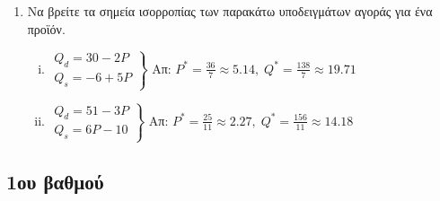 \begin{enumerate}
  \item Να βρείτε τα σημεία ισορροπίας των παρακάτω υποδειγμάτων αγοράς για ένα προϊόν.
    \begin{enumerate}[i),itemsep=\baselineskip]
      \item $ 
        \left.
          \begin{matrix}
            Q_{d} = 30-2P \\
            Q_{s} = -6+5P
          \end{matrix} 
        \right\}$ 
        \hfill Απ: $ P^{*} = \frac{36}{7} \approx 5.14, \; Q^{*}= \frac{138}{7} 
        \approx 19.71 $

      \item $ 
        \left.
          \begin{matrix}
            Q_{d} = 51 - 3P \\
            Q_{s} = 6P - 10
          \end{matrix} 
        \right\}$ 
        \hfill Απ: $ P^{*} = \frac{25}{11} \approx 2.27, \; Q^{*}= \frac{156}{11} \approx
        14.18 $

    \end{enumerate}
\end{enumerate}


\begin{center}
  \minibox{\large\bfseries  \textcolor{Col1}{Εξισώσεις}}
\end{center}

\subsection*{1ου βαθμού}

